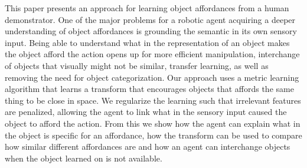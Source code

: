 This paper presents an approach for learning object affordances from a
human demonstrator. One of the major problems for a robotic agent
acquiring a deeper understanding of object affordances is grounding the
semantic in its own sensory input. Being able to understand what in the
representation of an object makes the object afford the action opens up
for more efficient manipulation, interchange of objects that visually
might not be similar, transfer learning, as well as removing the need
for object categorization. Our approach uses a metric learning algorithm
that learns a transform that encourages objects that affords the same
thing to be close in space. We regularize the learning such that
irrelevant features are penalized, allowing the agent to link what in
the sensory input caused the object to afford the action. From this we
show how the agent can explain what in the object is specific for an
affordance, how the transform can be used to compare how similar
different affordances are and how an agent can interchange objects when
the object learned on is not available.

\begin{comment}
1. state the problem
2. say why it is interesting
3. say what your solution achieves
4. say what follows from your solution.
\end{comment}
